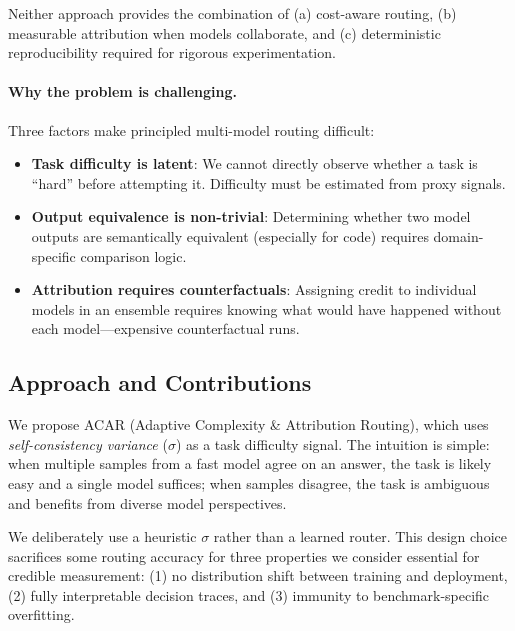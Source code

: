 \documentclass{article}
\newcommand{\acar}{\textsc{ACAR}}
\begin{document}
Neither approach provides the combination of (a) cost-aware routing, (b) measurable attribution when models collaborate, and (c) deterministic reproducibility required for rigorous experimentation.

\paragraph{Why the problem is challenging.}
Three factors make principled multi-model routing difficult:

\begin{itemize}[leftmargin=*, itemsep=2pt]
    \item \textbf{Task difficulty is latent}: We cannot directly observe whether a task is ``hard'' before attempting it. Difficulty must be estimated from proxy signals.
    \item \textbf{Output equivalence is non-trivial}: Determining whether two model outputs are semantically equivalent (especially for code) requires domain-specific comparison logic.
    \item \textbf{Attribution requires counterfactuals}: Assigning credit to individual models in an ensemble requires knowing what would have happened without each model---expensive counterfactual runs.
\end{itemize}

\subsection{Approach and Contributions}

We propose \acar{} (Adaptive Complexity \& Attribution Routing), which uses \emph{self-consistency variance} ($\sigma$) as a task difficulty signal. The intuition is simple: when multiple samples from a fast model agree on an answer, the task is likely easy and a single model suffices; when samples disagree, the task is ambiguous and benefits from diverse model perspectives.

We deliberately use a heuristic $\sigma$ rather than a learned router. This design choice sacrifices some routing accuracy for three properties we consider essential for credible measurement: (1) no distribution shift between training and deployment, (2) fully interpretable decision traces, and (3) immunity to benchmark-specific overfitting.
\end{document}
